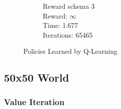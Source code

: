 \documentclass[a4paper,10pt]{article}
\begin{document}
\begin{figure}[h!]
\begin{subfigure}[b]{0.3\textwidth}
                \caption{Reward schema 3 \\
                Reward: $\infty$\\
                Time: 1.677 \\
                Iterations: 65465 }
                \label{fig:mouse}
        \end{subfigure}
        \caption{Policies Learned by Q-Learning}\label{fig:animals}
\end{figure}

\subsection{50x50 World}

\subsubsection{Value Iteration}
\end{document}
